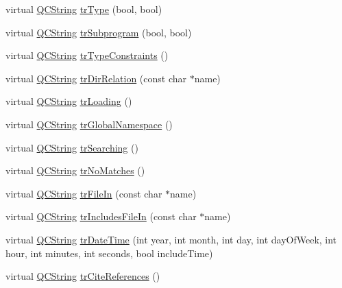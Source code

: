 \begin{DoxyCompactItemize}
\item 
virtual \mbox{\hyperlink{class_q_c_string}{Q\+C\+String}} \mbox{\hyperlink{class_translator_japanese_afe53027b537d75f15b36d972ef1c83f4}{tr\+Type}} (bool, bool)
\item 
virtual \mbox{\hyperlink{class_q_c_string}{Q\+C\+String}} \mbox{\hyperlink{class_translator_japanese_a8af1dd8d9b0ee2f95eb53bd7996b3580}{tr\+Subprogram}} (bool, bool)
\item 
virtual \mbox{\hyperlink{class_q_c_string}{Q\+C\+String}} \mbox{\hyperlink{class_translator_japanese_ab939c0522440d2a44474efb3594e4b29}{tr\+Type\+Constraints}} ()
\item 
virtual \mbox{\hyperlink{class_q_c_string}{Q\+C\+String}} \mbox{\hyperlink{class_translator_japanese_a6439a677a30660562565a37df3469aff}{tr\+Dir\+Relation}} (const char $\ast$name)
\item 
virtual \mbox{\hyperlink{class_q_c_string}{Q\+C\+String}} \mbox{\hyperlink{class_translator_japanese_a25ecacc49af6381bb740bb9e2a68c42c}{tr\+Loading}} ()
\item 
virtual \mbox{\hyperlink{class_q_c_string}{Q\+C\+String}} \mbox{\hyperlink{class_translator_japanese_a5dc83a5a2f62b37815e590c651c7805c}{tr\+Global\+Namespace}} ()
\item 
virtual \mbox{\hyperlink{class_q_c_string}{Q\+C\+String}} \mbox{\hyperlink{class_translator_japanese_a6e75ae8c17f2b5b43814b15eaf7693c9}{tr\+Searching}} ()
\item 
virtual \mbox{\hyperlink{class_q_c_string}{Q\+C\+String}} \mbox{\hyperlink{class_translator_japanese_a67dcb66cf4ac9376069a6064100b3e0e}{tr\+No\+Matches}} ()
\item 
virtual \mbox{\hyperlink{class_q_c_string}{Q\+C\+String}} \mbox{\hyperlink{class_translator_japanese_a0b4f3f23c0d955ab3d49639a0781d429}{tr\+File\+In}} (const char $\ast$name)
\item 
virtual \mbox{\hyperlink{class_q_c_string}{Q\+C\+String}} \mbox{\hyperlink{class_translator_japanese_afa05a22f2cb6629b86c326b0fe56a3ac}{tr\+Includes\+File\+In}} (const char $\ast$name)
\item 
virtual \mbox{\hyperlink{class_q_c_string}{Q\+C\+String}} \mbox{\hyperlink{class_translator_japanese_a6be353f75bc39756320621241ee4f385}{tr\+Date\+Time}} (int year, int month, int day, int day\+Of\+Week, int hour, int minutes, int seconds, bool include\+Time)
\item 
virtual \mbox{\hyperlink{class_q_c_string}{Q\+C\+String}} \mbox{\hyperlink{class_translator_japanese_ad2d0fd23566c18aaefedc6f154072401}{tr\+Cite\+References}} ()

\end{DoxyCompactItemize}
